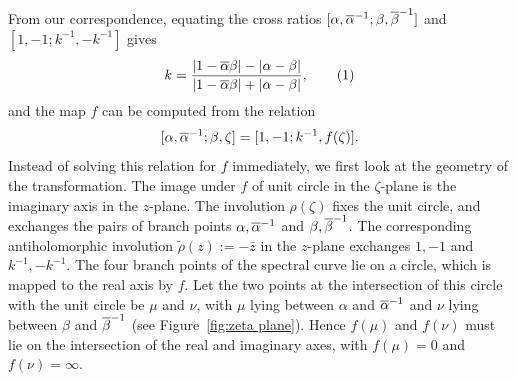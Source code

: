 \documentclass{article}
\begin{document}


From our correspondence, equating the cross ratios $[\alpha,\overline{\alpha}^{-1};\beta,\overline{\beta}^{-1}]$ and\\ $[1,-1;k^{-1},-k^{-1}]$ gives
\[
k = \frac{\abs{1-\bar{\alpha}\beta}-\abs{\alpha-\beta}}{\abs{1-\bar{\alpha}\beta}+\abs{\alpha-\beta}},
\labelthis{eqn:def_k}
\]
and the map $f$ can be computed from the relation
\[
[\alpha,\overline{\alpha}^{-1};\beta,\zeta] = [1,-1;k^{-1},f(\zeta)].
\]
Instead of solving this relation for $f$ immediately, we first look at the geometry of the transformation.
The image under $f$ of unit circle in the $\zeta$-plane is the imaginary axis in the $z$-plane. The involution $\rho(\zeta)$ fixes the unit circle, and exchanges the pairs of branch points $\alpha,\overline{\alpha}^{-1}$ and $\beta,\overline{\beta}^{-1}$. The corresponding antiholomorphic involution $\tilde{\rho}(z) := -\bar{z}$ in the $z$-plane exchanges $1,-1$ and $k^{-1},-k^{-1}$. The four branch points of the spectral curve lie on a circle, which is mapped to the real axis by $f$. Let the two points at the intersection of this circle with the unit circle be $\mu$ and $\nu$, with $\mu$ lying between $\alpha$ and $\overline{\alpha}^{-1}$ and $\nu$ lying between $\beta$ and $\overline{\beta}^{-1}$ (see Figure~\ref{fig:zeta plane}). Hence $f(\mu)$ and $f(\nu)$ must lie on the intersection of the real and imaginary axes, with $f(\mu) = 0$ and $f(\nu) = \infty$.
\end{document}
